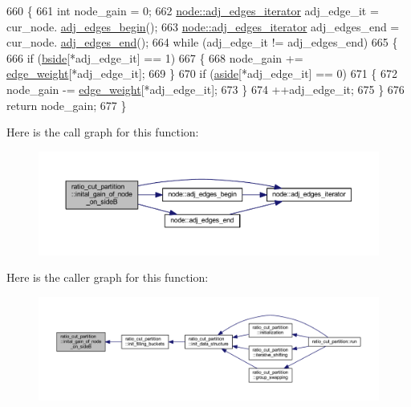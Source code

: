 \begin{DoxyCode}
660 \{
661     \textcolor{keywordtype}{int} node\_gain = 0;
662     \mbox{\hyperlink{classnode_a12cb1a2167f5f03c054de5e707d3156f}{node::adj\_edges\_iterator}} adj\_edge\_it = cur\_node.
      \mbox{\hyperlink{classnode_a788d3e932a5c164caa5ec82aa47551b2}{adj\_edges\_begin}}();
663     \mbox{\hyperlink{classnode_a12cb1a2167f5f03c054de5e707d3156f}{node::adj\_edges\_iterator}} adj\_edges\_end = cur\_node.
      \mbox{\hyperlink{classnode_aa1e7887d29390297580769454f769ad6}{adj\_edges\_end}}();
664     \textcolor{keywordflow}{while} (adj\_edge\_it != adj\_edges\_end)
665     \{
666     \textcolor{keywordflow}{if} (\mbox{\hyperlink{classratio__cut__partition_ab9c1166efb1cbb65ff6c55bb6e3c9e6d}{bside}}[*adj\_edge\_it] == 1)
667     \{
668         node\_gain += \mbox{\hyperlink{classratio__cut__partition_a48a85c82fb09b83c9d494d6d1232fab2}{edge\_weight}}[*adj\_edge\_it];
669     \}
670     \textcolor{keywordflow}{if} (\mbox{\hyperlink{classratio__cut__partition_a112bfcfb9d05d5bbdeb29576a61399e1}{aside}}[*adj\_edge\_it] == 0)
671     \{
672         node\_gain -= \mbox{\hyperlink{classratio__cut__partition_a48a85c82fb09b83c9d494d6d1232fab2}{edge\_weight}}[*adj\_edge\_it];
673     \}
674     ++adj\_edge\_it;
675     \}
676     \textcolor{keywordflow}{return} node\_gain;
677 \}
\end{DoxyCode}
Here is the call graph for this function\+:\nopagebreak
\begin{figure}[H]
\begin{center}
\leavevmode
\includegraphics[width=350pt]{classratio__cut__partition_ab1c602d2c984844f9fe51c4a889327c4_cgraph}
\end{center}
\end{figure}
Here is the caller graph for this function\+:\nopagebreak
\begin{figure}[H]
\begin{center}
\leavevmode
\includegraphics[width=350pt]{classratio__cut__partition_ab1c602d2c984844f9fe51c4a889327c4_icgraph}
\end{center}
\end{figure}
\mbox{\label{classratio__cut__partition_af4723810ece28284c79001b9ccf42ca4}} 
